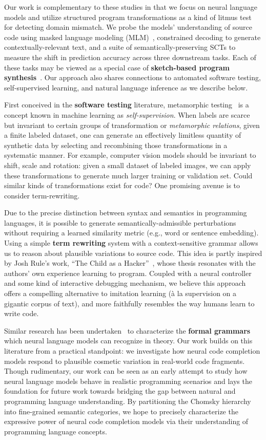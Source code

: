\documentclass[usenames,dvipsnames]{article} %
\begin{document}
  Our work is complementary to these studies in that we focus on neural language models and utilize structured program transformations as a kind of litmus test for detecting domain mismatch. We probe the models' understanding of source code using masked language modeling (MLM)~\citep{sinha2021masked}, constrained decoding to generate contextually-relevant text, and a suite of semantically-preserving SCTs to measure the shift in prediction accuracy across three downstream tasks. Each of these tasks may be viewed as a special case of \textbf{sketch-based program synthesis}~\citep{solar2008program}. Our approach also shares connections to automated software testing, self-supervised learning, and natural language inference as we describe below.

  First conceived in the \textbf{software testing} literature, metamorphic testing~\cite{chen1995metamorphic} is a concept known in machine learning as \textit{self-supervision}. When labels are scarce but invariant to certain groups of transformation or \textit{metamorphic relations}, given a finite labeled dataset, one can generate an effectively limitless quantity of synthetic data by selecting and recombining those transformations in a systematic manner. For example, computer vision models should be invariant to shift, scale and rotation: given a small dataset of labeled images, we can apply these transformations to generate much larger training or validation set. Could similar kinds of transformations exist for code? One promising avenue is to consider term-rewriting.

  Due to the precise distinction between syntax and semantics in programming languages, it is possible to generate semantically-admissible perturbations without requiring a learned similarity metric (e.g., word or sentence embedding). Using a simple \textbf{term rewriting} system with a context-sensitive grammar allows us to reason about plausible variations to source code. This idea is partly inspired by Josh Rule's work, ``The Child as a Hacker''~\citep{rule2020child}, whose thesis resonates with the authors' own experience learning to program. Coupled with a neural controller and some kind of interactive debugging mechanism, we believe this approach offers a compelling alternative to imitation learning (à la supervision on a gigantic corpus of text), and more faithfully resembles the way humans learn to write code.

  Similar research has been undertaken~\citep{weiss2018practical, merrill2021power} to characterize the \textbf{formal grammars} which neural language models can recognize in theory. Our work builds on this literature from a practical standpoint: we investigate how neural code completion models respond to plausible cosmetic variation in real-world code fragments. Though rudimentary, our work can be seen as an early attempt to study how neural language models behave in realistic programming scenarios and lays the foundation for future work towards bridging the gap between natural and programming language understanding. By partitioning the Chomsky hierarchy into fine-grained semantic categories, we hope to precisely characterize the expressive power of neural code completion models via their understanding of programming language concepts.
\end{document}
